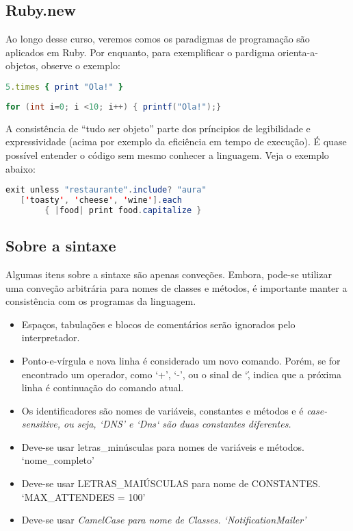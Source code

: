 \documentclass[serif,mathserif]{article}
\begin{document}
 

\subsection{Ruby.new}

Ao longo desse curso, veremos comos os paradigmas de programação são aplicados em Ruby. Por enquanto, para exemplificar o pardigma orienta-a-objetos,
observe o exemplo:

\begin{lstlisting}[language=ruby]
5.times { print "Ola!" }
\end{lstlisting}

\begin{lstlisting}[language=java]
for (int i=0; i <10; i++) { printf("Ola!");}
\end{lstlisting}

A consistência de ``tudo ser objeto''\cite{abadi_theory_1996} parte dos príncipios de legibilidade e expressividade (acima por exemplo da eficiência em tempo de execução). É quase possível entender o código sem mesmo conhecer a linguagem. 
Veja o exemplo abaixo:

\begin{lstlisting}[language=java]
   exit unless "restaurante".include? "aura"
   ['toasty', 'cheese', 'wine'].each 
        { |food| print food.capitalize }
\end{lstlisting}

\subsection{Sobre a sintaxe}

Algumas itens sobre a sintaxe são apenas conveções. Embora, pode-se utilizar uma conveção arbitrária para nomes de classes e métodos, é importante manter
a consistência com os programas da linguagem.
 
\begin{itemize}
  \item  Espaços, tabulações e blocos de comentários serão ignorados pelo interpretador.
  \item  Ponto-e-vírgula e nova linha é considerado um novo comando. Porém, se for encontrado um operador, como `+', `-', ou o sinal de `\', indica que a 
próxima linha é continuação do comando atual.
  \item  Os identificadores são nomes de variáveis, constantes e métodos e é \em{case-sensitive}, ou seja, `DNS' e `Dns` são duas constantes diferentes.
  \item  Deve-se usar letras\_minúsculas para nomes de variáveis e métodos. `nome\_completo'
  \item  Deve-se usar LETRAS\_MAIÚSCULAS para nome de CONSTANTES. `MAX\_ATTENDEES = 100'
  \item  Deve-se usar \em{CamelCase} para nome de Classes. `NotificationMailer'
\end{itemize}
\end{document}
